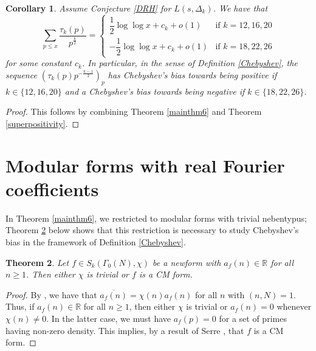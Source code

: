 \documentclass[12pt,reqno]{amsart}
\newtheorem{theorem}{Theorem}[section]
\newtheorem{corollary}[theorem]{Corollary}
\theoremstyle{definition}
\numberwithin{equation}{section}
\begin{document}
\begin{corollary}
Assume Conjecture \ref{DRH} for $L(s, \Delta_k)$. We have that 
\begin{equation*}\label{tauk}
\sum_{p \leqslant x} \frac{\tau_{k}(p)}{p^{\frac{k}{2}}} = 
	\begin{cases}
	\dfrac{1}{2} \log \log x+c_k+o(1) & \text{if $k = 12, 16, 20 $} \\
	-\dfrac{1}{2} \log \log x+c_k+o(1) &\text{if $k = 18, 22, 26$}
\end{cases}
\end{equation*}
for some constant $c_k$.  In particular, in the sense of Definition \ref{Chebyshev}, the sequence $(\tau_k(p) p^{-\frac{k-1}{2}})_p$ has Chebyshev's bias towards being positive if $k \in \{12, 16, 20\}$ and a Chebyshev's bias towards being negative if $k \in \{18, 22, 26\}$.
\end{corollary}

\begin{proof}
This follows by combining Theorem \ref{mainthm6} and Theorem \ref{superpositivity}. \qedhere
\end{proof}

\appendix 

\section{Modular forms with real Fourier coefficients}

In Theorem \ref{mainthm6}, we restricted to modular forms with trivial nebentypus; Theorem \ref{rel} below shows that this restriction is necessary to study Chebyshev's bias in the framework of Definition \ref{Chebyshev}. 


\begin{theorem} \label{rel}
Let $f \in S_k(\Gamma_0(N), \chi)$ be a newform with $a_f(n) \in \mathbb R$ for all $n \geq 1$.  Then either $\chi$ is trivial or $f$ is a CM form. 
\end{theorem}

\begin{proof}
By \cite[Equation (6.57)]{Iwa97}, we have that 
$
\overline{a_f(n)}= \chi(n) a_f(n) 
$ for all $n$ with $(n, N)=1$. Thus, if $a_f(n) \in \mathbb R$ for all $n \geq 1$, then either $\chi$ is trivial or $a_f(n)=0$ whenever $\chi(n) \neq 0$. In the latter case, we must have $a_f(p)=0$ for a set of primes having non-zero density. This implies, by a result of Serre \cite[Corollaire 2, p.174]{Ser81}, that $f$ is a CM form. 
\end{proof}
\end{document}
